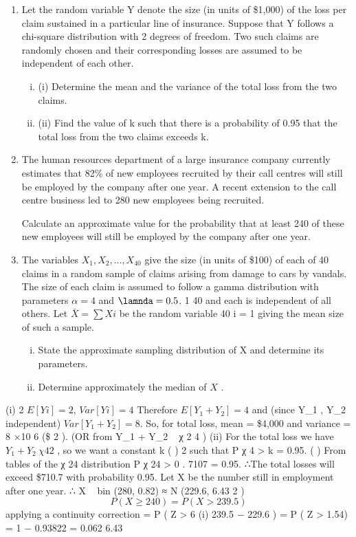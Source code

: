 \documentclass[a4paper,12pt]{article}
\begin{document}
\begin{enumerate}
\item 
Let the random variable Y denote the size (in units of \$1,000) of the loss per claim sustained in a particular line of insurance. Suppose that Y follows a chi-square distribution with 2 degrees of freedom. Two such claims are randomly chosen and
their corresponding losses are assumed to be independent of each other.
\begin{enumerate}[(i)]
\item (i) Determine the mean and the variance of the total loss from the two claims. 
\item (ii) Find the value of k such that there is a probability of 0.95 that the total loss from the two claims exceeds k.
\end{enumerate}
\item 
The human resources department of a large insurance company currently estimates that 82\% of new employees recruited by their call centres will still be employed by the company after one year. A recent extension to the call centre business led to 280
new employees being recruited.

Calculate an approximate value for the probability that at least 240 of these new employees will still be employed by the company after one year.
\item The variables $X_1 , X_2 , ..., X_{40}$ give the size (in units of \$100) of each of 40 claims in a random sample of claims arising from damage to cars by vandals. The size of each claim is assumed to follow a gamma distribution with parameters $\alpha = 4$ and $\lamnda = 0.5$.
1 40
and each is independent of all others. Let $\bar{X} =
\sum X i$ be the random variable
40 i = 1
giving the mean size of such a sample.
\begin{enumerate}[(i)]
\item 
State the approximate sampling distribution of X and determine its parameters.
\item 
Determine approximately the median of $X$ .
\end{enumerate}
\end{enumerate}
(i)
2
$E [ Y i ] = 2$, $Var [ Y i ] = 4$
Therefore $E [ Y_1 + Y_2 ] = 4$ and (since Y_1 , Y_2 independent) $Var [ Y_1 + Y_2 ] = 8$.
So, for total loss, mean = \$4,000 and variance = 8 ×10 6 (\$ 2 ).
(OR from Y_1 + Y_2 ~ χ 2 4 )
(ii)
For the total loss we have $Y_1 + Y_2 ~ χ 4 2$ , so we want a constant k
(
)
2
such that P χ 4 > k = 0.95.
(
)
From tables of the χ 24 distribution P χ 24 > 0 . 7107 = 0.95.
∴The total losses will exceed \$710.7 with probability 0.95.
Let X be the number still in employment after one year.
∴ X ~ bin (280, 0.82) ≈ N (229.6, 6.43 2 )
\[P ( X \geq 240) = P ( X > 239.5)\] applying a continuity correction
= P ( Z >
6
(i)
239.5 − 229.6
) = P ( Z > 1.54) = 1 − 0.93822 = 0.062
6.43
\end{document}
